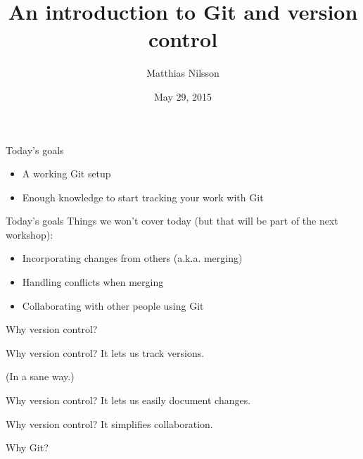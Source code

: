\documentclass{beamer}
\title{An introduction to Git and version control}
\author{Matthias Nilsson}
\institute{Chalmers University of Technology}
\date{May 29, 2015}
\begin{document}
{
\begin{frame}
\maketitle
\end{frame}
}

\begin{frame}{Today's goals}
  \begin{itemize}
  \item A working Git setup
  \item Enough knowledge to start tracking your work with Git
  \end{itemize}
\end{frame}

\begin{frame}{Today's goals}
  Things we won't cover today (but that will be part of the next workshop):

  \begin{itemize}
    \item Incorporating changes from others (a.k.a. merging)
    \item Handling conflicts when merging
    \item Collaborating with other people using Git
  \end{itemize}
\end{frame}

\begin{frame}{}
  \center
  \Huge Why version control?
\end{frame}

\begin{frame}{Why version control?}
  \center
  \Huge It lets us track versions.
  \pause

  \huge (In a sane way.)
\end{frame}

\begin{frame}{Why version control?}
  \center
  \Huge It lets us easily document changes.
\end{frame}

\begin{frame}{Why version control?}
  \center
  \Huge It simplifies collaboration.
\end{frame}

\begin{frame}{}
  \center
  \Huge Why Git?
\end{frame}
\end{document}
